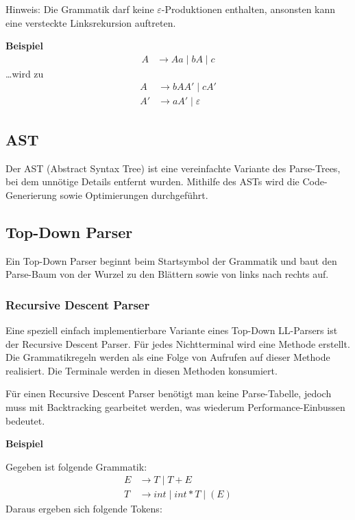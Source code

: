 Hinweis: Die Grammatik darf keine $\varepsilon$-Produktionen enthalten, ansonsten kann eine
versteckte Linksrekursion auftreten.

\textbf{Beispiel}
%
\begin{align*}
	A &\rightarrow Aa \mid bA \mid c
\end{align*}
%
\ldots{wird} zu
%
\begin{align*}
	A  &\rightarrow bAA' \mid cA' \\
	A' &\rightarrow aA' \mid \varepsilon 
\end{align*}


\subsection{AST}

Der AST (Abstract Syntax Tree) ist eine vereinfachte Variante des Parse-Trees,
bei dem unnötige Details entfernt wurden. Mithilfe des ASTs wird die
Code-Generierung sowie Optimierungen durchgeführt.


\subsection{Top-Down Parser} 

Ein Top-Down Parser beginnt beim Startsymbol der Grammatik und baut den
Parse-Baum von der Wurzel zu den Blättern sowie von links nach rechts auf.

\subsubsection{Recursive Descent Parser}

Eine speziell einfach implementierbare Variante eines Top-Down LL-Parsers ist
der Recursive Descent Parser. Für jedes Nichtterminal wird eine Methode
erstellt. Die Grammatikregeln werden als eine Folge von Aufrufen auf dieser
Methode realisiert. Die Terminale werden in diesen Methoden konsumiert.

Für einen Recursive Descent Parser benötigt man keine Parse-Tabelle, jedoch muss
mit Backtracking gearbeitet werden, was wiederum Performance-Einbussen bedeutet.

\textbf{Beispiel}

Gegeben ist folgende Grammatik:
%
\begin{align*}
	E &\rightarrow T \mid T + E \\
	T &\rightarrow int \mid int * T \mid (E)
\end{align*}
%
Daraus ergeben sich folgende Tokens:

